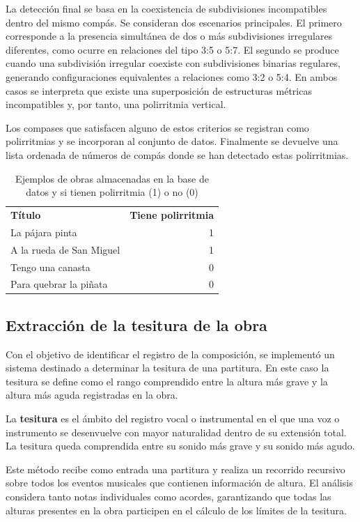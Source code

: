 La detección final se basa en la coexistencia de subdivisiones incompatibles dentro del mismo compás. Se consideran dos escenarios principales. El primero corresponde a la presencia simultánea de dos o más subdivisiones irregulares diferentes, como ocurre en relaciones del tipo 3:5 o 5:7. El segundo se produce cuando una subdivisión irregular coexiste con subdivisiones binarias regulares, generando configuraciones equivalentes a relaciones como 3:2 o 5:4. En ambos casos se interpreta que existe una superposición de estructuras métricas incompatibles y, por tanto, una polirritmia vertical.

Los compases que satisfacen alguno de estos criterios se registran como polirritmias y se incorporan al conjunto de datos. Finalmente se devuelve una lista ordenada de números de compás donde se han detectado estas polirritmias.

\begin{table}[H]
\centering
\begin{tabular}{lr}
\textbf{Título} & \textbf{Tiene polirritmia} \\
La pájara pinta & 1 \\
A la rueda de San Miguel & 1 \\
Tengo una canasta & 0 \\
Para quebrar la piñata & 0 \\
\end{tabular}
\caption{Ejemplos de obras almacenadas en la base de datos y si tienen polirritmia (1) o no (0)}
\end{table}

\subsection{Extracción de la tesitura de la obra}
Con el objetivo de identificar el registro de la composición, se implementó un sistema destinado a determinar la tesitura de una partitura. En este caso la tesitura se define como el rango comprendido entre la altura más grave y la altura más aguda registradas en la obra.

La \textbf{tesitura} \citep{grove1900dictionary} es el ámbito del registro vocal o instrumental en el que una voz o instrumento se desenvuelve con mayor naturalidad dentro de su extensión total. La tesitura queda comprendida entre su sonido más grave y su sonido más agudo.

Este método recibe como entrada una partitura y realiza un recorrido recursivo sobre todos los eventos musicales que contienen información de altura. El análisis considera tanto notas individuales como acordes, garantizando que todas las alturas presentes en la obra participen en el cálculo de los límites de la tesitura.

